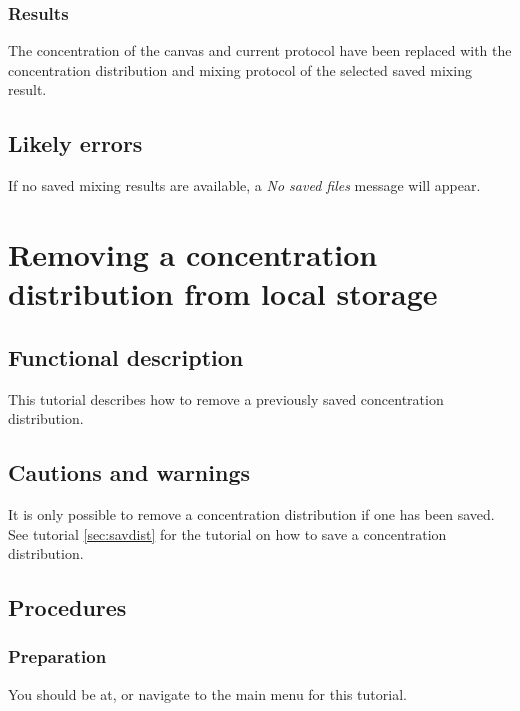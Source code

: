 \subsubsection{Results}
The concentration of the canvas and current protocol have been replaced with the concentration distribution and mixing protocol of the selected saved mixing result.

\subsection{Likely errors}
If no saved mixing results are available, a \emph{No saved files} message will appear.


\section{Removing a concentration distribution from local storage}
\label{sec:remdist}

\subsection{Functional description}
This tutorial describes how to remove a previously saved concentration distribution.

\subsection{Cautions and warnings}
It is only possible to remove a concentration distribution if one has been saved. See tutorial \ref{sec:savdist} for the tutorial on how to save a concentration distribution.

\subsection{Procedures}

\subsubsection{Preparation}
You should be at, or navigate to the main menu for this tutorial.


